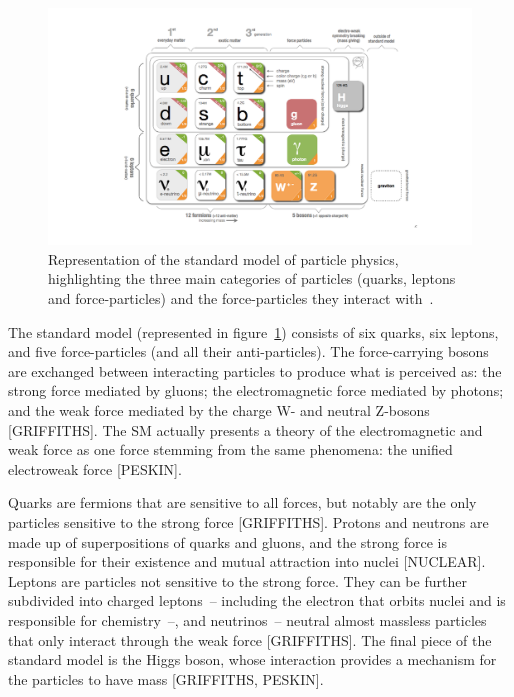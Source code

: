 \begin{figure}
    \centering
    \includegraphics[width = \textwidth]{figures/standardmodel_galbraith_carsten.png}
    \caption{Representation of the standard model of particle physics, highlighting the three main categories of particles (quarks, leptons and force-particles) and the force-particles they interact with~\cite{galbraith_ux_2013}.}
    \label{fig:standard_model}
\end{figure}

The standard model (represented in figure~\ref{fig:standard_model}) consists of six quarks, six leptons, and five force-particles (and all their anti-particles). The force-carrying bosons are exchanged between interacting particles to produce what is perceived as: the strong force mediated by gluons; the electromagnetic force mediated by photons; and the weak force mediated by the charge W- and neutral Z-bosons [GRIFFITHS]. The SM actually presents a theory of the electromagnetic and weak force as one force stemming from the same phenomena: the unified electroweak force [PESKIN]. 

Quarks are fermions that are sensitive to all forces, but notably are the only particles sensitive to the strong force [GRIFFITHS]. Protons and neutrons are made up of superpositions of quarks and gluons, and the strong force is responsible for their existence and mutual attraction into nuclei [NUCLEAR]. Leptons are particles not sensitive to the strong force. They can be further subdivided into charged leptons~-- including the electron that orbits nuclei and is responsible for chemistry~--, and neutrinos~-- neutral almost massless particles that only interact through the weak force [GRIFFITHS]. The final piece of the standard model is the Higgs boson, whose interaction provides a mechanism for the particles to have mass [GRIFFITHS, PESKIN].

